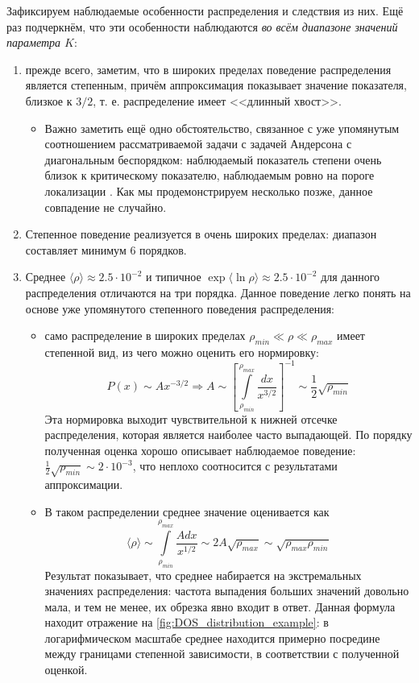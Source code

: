 Зафиксируем наблюдаемые особенности распределения и следствия из них. Ещё раз подчеркнём, что эти особенности наблюдаются \textit{во всём диапазоне значений параметра $K$}:
\begin{enumerate}
	\item прежде всего, заметим, что в широких пределах поведение распределения является степенным, причём аппроксимация показывает значение показателя, близкое к $3/2$, т. е. распределение имеет <<длинный хвост>>.
	\begin{itemize}
		\item Важно заметить ещё одно обстоятельство, связанное с уже упомянутым соотношением рассматриваемой задачи с задачей Андерсона с диагональным беспорядком: наблюдаемый показатель степени очень близок к критическому показателю, наблюдаемым ровно на пороге локализации \cite{AAT}. Как мы продемонстрируем несколько позже, данное совпадение не случайно.
	\end{itemize}
	\item Степенное поведение реализуется в очень широких пределах: диапазон составляет минимум 6 порядков.
	\item Среднее $\langle \rho \rangle \approx 2.5 \cdot 10^{-2}$ и типичное $\exp \langle \ln \rho \rangle  \approx 2.5 \cdot 10^{-2}$  для данного распределения отличаются на три порядка. Данное поведение легко понять на основе уже упомянутого степенного поведения распределения:
	\begin{itemize}
		\item само распределение в широких пределах $\rho_{min} \ll \rho \ll \rho_{max}$ имеет степенной вид, из чего можно оценить его нормировку:
		$$
		P(x) \sim A x^{-3/2} \Rightarrow A \sim \left[ \int \limits_{ \rho_{min} }^{ \rho_{max} } \frac{dx}{x^{3/2}} \right]^{-1} \sim \frac{1}{2} \sqrt{\rho_{min}}
		$$
		Эта нормировка выходит чувствительной к нижней отсечке распределения, которая является наиболее часто выпадающей. По порядку полученная оценка хорошо описывает наблюдаемое поведение: $\frac{1}{2} \sqrt{ \rho_{min} } \sim 2 \cdot 10^{-3}$, что неплохо соотносится с результатами аппроксимации.
		\item В таком распределении среднее значение оценивается как
		$$
		\langle \rho \rangle \sim \int \limits_{ \rho_{min} }^{ \rho_{max} } \frac{A dx}{x^{1/2}} \sim 2 A \sqrt{\rho_{max}} \sim \sqrt{\rho_{max} \rho_{min}} 
		$$
		Результат показывает, что среднее набирается на экстремальных значениях распределения: частота выпадения больших значений довольно мала, и тем не менее, их обрезка явно входит в ответ. Данная формула находит отражение на \ref{fig:DOS_distribution_example}: в логарифмическом масштабе среднее находится примерно посредине между границами степенной зависимости, в соответствии с полученной оценкой. 

\end{itemize}
\end{enumerate}
